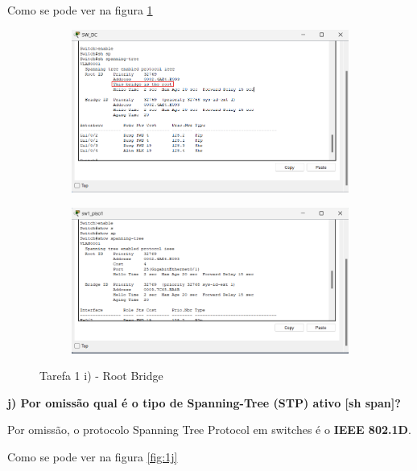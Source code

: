 \documentclass[11pt,english, openright, oneside]{book}
\begin{document}
Como se pode ver na figura \ref{fig:1i}
\vspace{0.4cm}
\begin{figure}[h]
    \centering
    \begin{subfigure}{.47\textwidth}
        \centering
        \includegraphics[width=0.99\linewidth]{imagens/Tarefa1/1.i.png}
    \end{subfigure}%
    \begin{subfigure}{.53\textwidth}
        \centering
        \includegraphics[width=0.99\linewidth]{imagens/Tarefa1/1.i.2.png}
    \end{subfigure}
    \caption{Tarefa 1 i) - Root Bridge}
    \label{fig:1i}
\end{figure}

\newpage

\textbf{j) Por omissão qual é o tipo de Spanning-Tree (STP) ativo [sh span]?}
\vspace{0.2cm}

Por omissão, o protocolo Spanning Tree Protocol em switches é o \textbf{IEEE
802.1D}.

Como se pode ver na figura \ref{fig:1j}
\vspace{0.4cm}
\end{document}
